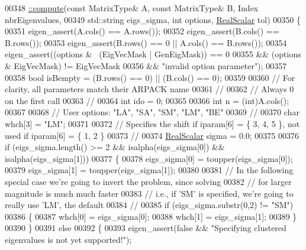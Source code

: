 \begin{DoxyCode}
00348 \hyperlink{class_eigen_1_1_arpack_generalized_self_adjoint_eigen_solver_a1a905e5e65e82e559a2cc394a9f42385}{::compute}(\textcolor{keyword}{const} MatrixType& A, \textcolor{keyword}{const} MatrixType& B, Index nbrEigenvalues,
00349           std::string eigs\_sigma, \textcolor{keywordtype}{int} options, \hyperlink{class_eigen_1_1_arpack_generalized_self_adjoint_eigen_solver_a2555af55e53bf9de894a49e639be2e1e}{RealScalar} tol)
00350 \{
00351   eigen\_assert(A.cols() == A.rows());
00352   eigen\_assert(B.cols() == B.rows());
00353   eigen\_assert(B.rows() == 0 || A.cols() == B.rows());
00354   eigen\_assert((options &~ (EigVecMask | GenEigMask)) == 0
00355             && (options & EigVecMask) != EigVecMask
00356             && \textcolor{stringliteral}{"invalid option parameter"});
00357 
00358   \textcolor{keywordtype}{bool} isBempty = (B.rows() == 0) || (B.cols() == 0);
00359 
00360   \textcolor{comment}{// For clarity, all parameters match their ARPACK name}
00361   \textcolor{comment}{//}
00362   \textcolor{comment}{// Always 0 on the first call}
00363   \textcolor{comment}{//}
00364   \textcolor{keywordtype}{int} ido = 0;
00365 
00366   \textcolor{keywordtype}{int} n = (int)A.cols();
00367 
00368   \textcolor{comment}{// User options: "LA", "SA", "SM", "LM", "BE"}
00369   \textcolor{comment}{//}
00370   \textcolor{keywordtype}{char} whch[3] = \textcolor{stringliteral}{"LM"};
00371     
00372   \textcolor{comment}{// Specifies the shift if iparam[6] = \{ 3, 4, 5 \}, not used if iparam[6] = \{ 1, 2 \}}
00373   \textcolor{comment}{//}
00374   \hyperlink{class_eigen_1_1_arpack_generalized_self_adjoint_eigen_solver_a2555af55e53bf9de894a49e639be2e1e}{RealScalar} sigma = 0.0;
00375 
00376   \textcolor{keywordflow}{if} (eigs\_sigma.length() >= 2 && isalpha(eigs\_sigma[0]) && isalpha(eigs\_sigma[1]))
00377   \{
00378       eigs\_sigma[0] = toupper(eigs\_sigma[0]);
00379       eigs\_sigma[1] = toupper(eigs\_sigma[1]);
00380 
00381       \textcolor{comment}{// In the following special case we're going to invert the problem, since solving}
00382       \textcolor{comment}{// for larger magnitude is much much faster}
00383       \textcolor{comment}{// i.e., if 'SM' is specified, we're going to really use 'LM', the default}
00384       \textcolor{comment}{//}
00385       \textcolor{keywordflow}{if} (eigs\_sigma.substr(0,2) != \textcolor{stringliteral}{"SM"})
00386       \{
00387           whch[0] = eigs\_sigma[0];
00388           whch[1] = eigs\_sigma[1];
00389       \}
00390   \}
00391   \textcolor{keywordflow}{else}
00392   \{
00393       eigen\_assert(\textcolor{keyword}{false} && \textcolor{stringliteral}{"Specifying clustered eigenvalues is not yet supported!"});

\end{DoxyCode}
